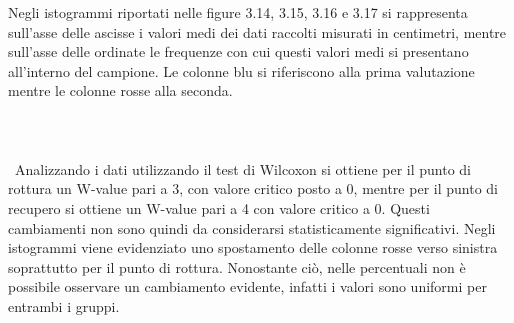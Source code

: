 Negli istogrammi riportati nelle figure 3.14, 3.15, 3.16 e 3.17 si rappresenta sull’asse delle ascisse i valori medi dei dati raccolti misurati in centimetri, mentre sull’asse delle ordinate le frequenze con cui questi valori medi si presentano all’interno del campione. Le colonne blu si riferiscono alla prima valutazione mentre le colonne rosse alla seconda.
\\\ \\\ \\\ \\\
Analizzando i dati utilizzando il test di Wilcoxon si ottiene per il punto di rottura un W-value pari a 3, con valore critico posto a 0, mentre per il punto di recupero si ottiene un W-value pari a 4 con valore critico a 0. Questi cambiamenti non sono quindi da considerarsi statisticamente significativi. Negli istogrammi viene evidenziato uno spostamento delle colonne rosse verso sinistra soprattutto per il punto di rottura. Nonostante ciò, nelle percentuali non è possibile osservare un cambiamento evidente, infatti i valori sono uniformi per entrambi i gruppi. 

